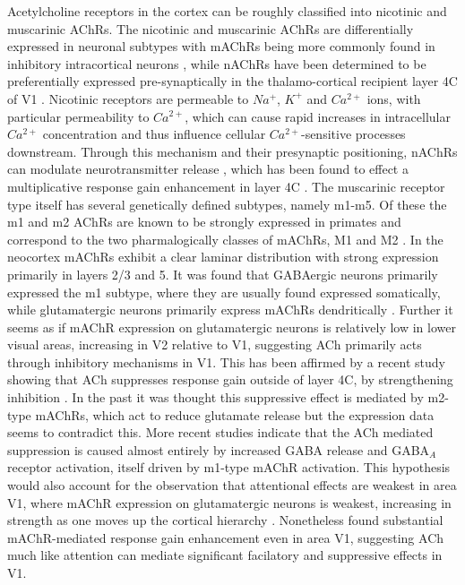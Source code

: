 Acetylcholine receptors in the cortex can be roughly classified into
nicotinic and muscarinic AChRs. The nicotinic and muscarinic AChRs are
differentially expressed in neuronal subtypes with mAChRs being more
commonly found in inhibitory intracortical neurons \citep{Disney2006},
while nAChRs have been determined to be preferentially expressed
pre-synaptically in the thalamo-cortical recipient layer 4C of V1
\citep{Disney2007}. Nicotinic receptors are permeable to $Na^+$, $K^+$
and $Ca^{2+}$ ions, with particular permeability to $Ca^{2+}$, which
can cause rapid increases in intracellular $Ca^{2+}$ concentration and
thus influence cellular $Ca^{2+}$-sensitive processes
downstream. Through this mechanism and their presynaptic positioning,
nAChRs can modulate neurotransmitter release
\citep{Lucas-Meunier2003}, which has been found to effect a
multiplicative response gain enhancement in layer 4C
\citep{Disney2007}. The muscarinic receptor type itself has several
genetically defined subtypes, namely m1-m5. Of these the m1 and m2
AChRs are known to be strongly expressed in primates and correspond to
the two pharmalogically classes of mAChRs, M1 and M2
\citep{Disney2006}. In the neocortex mAChRs exhibit a clear laminar
distribution with strong expression primarily in layers 2/3 and 5. It
was found that GABAergic neurons primarily expressed the m1 subtype,
where they are usually found expressed somatically, while
glutamatergic neurons primarily express mAChRs dendritically
\citep{Lucas-Meunier2003}. Further it seems as if mAChR expression on
glutamatergic neurons is relatively low in lower visual areas,
increasing in V2 relative to V1, suggesting ACh primarily acts through
inhibitory mechanisms in V1. This has been affirmed by a recent study
showing that ACh suppresses response gain outside of layer 4C, by
strengthening inhibition \citep{Disney2012}. In the past it was
thought this suppressive effect is mediated by m2-type mAChRs, which
act to reduce glutamate release
\citep{Hasselmo2004,Roberts2005,Yu2005} but the expression data seems
to contradict this. More recent studies indicate that the ACh mediated
suppression is caused almost entirely by increased GABA release and
GABA$_A$ receptor activation, itself driven by m1-type mAChR
activation. This hypothesis would also account for the observation
that attentional effects are weakest in area V1, where mAChR
expression on glutamatergic neurons is weakest, increasing in strength
as one moves up the cortical hierarchy \citep{Disney2006}. Nonetheless
\cite{Soma2012} found substantial mAChR-mediated response gain
enhancement even in area V1, suggesting ACh much like attention can
mediate significant facilatory and suppressive effects in V1.

